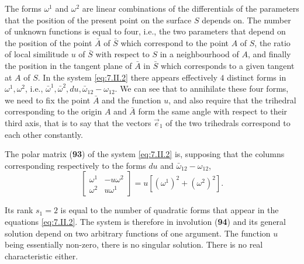 \documentclass[leqno,11pt]{book}
\numberwithin{equation}{chapter}
\theoremstyle{shape1}
\theoremstyle{shape0}
\theoremstyle{shape2}
\theoremstyle{definition}
\begin{document}
The forms $\omega^{1}$ and $\omega^{2}$ are linear combinations of the differentials of the parameters that the position of the present point on the surface $S$ depends on. The number of unknown functions is equal to four, i.e., the two parameters that depend on the position of the point $\bar A$ of $\bar S$ which correspond to the point $A$ of $S$, the ratio of local similitude $u$ of $\bar S$ with respect to $S$ in a neighbourhood of $A$, and finally the position in the tangent plane of $\bar A$ in $\bar S$ which corresponds to a given tangent at $A$ of $S$. In the system \eqref{eq:7.II.2} there appears effectively $4$ distinct forms in $\omega^{1},\omega^{2}$, i.e., $\bar\omega^{1},\bar\omega^{2},du,\bar\omega_{12}-\omega_{12}$. We can see that to annihilate these four forms, we need to fix the point $\bar A$ and the function $u$, and also require that the trihedral corresponding to the origin $A$ and $\bar A$ form the same angle with respect to their third axis, that is to say that the vectors $\vec e_{1}$ of the two trihedrals correspond to each other constantly.

The polar matrix (\textsection\textbf{93}) of the system \eqref{eq:7.II.2} is, supposing that the columns corresponding respectively to the forms $du$ and $\bar\omega_{12}-\omega_{12}$,
\begin{equation}
  \label{eq:7.II.3}
  \tag{II, 3}
  \begin{bmatrix}
    \omega^{1}&-u\omega^{2}\\
    \omega^{2}&u\omega^{1}
  \end{bmatrix}=u[(\omega^{1})^{2}+(\omega^{2})^{2}].
\end{equation}

Its rank $s_{1}=2$ is equal to the number of quadratic forms that appear in the equations \eqref{eq:7.II.2}. The system is therefore in involution (\textsection\textbf{94}) and its general solution depend on two arbitrary functions of one argument. The function $u$ being essentially non-zero, there is no singular solution. There is no real characteristic either.
\end{document}
